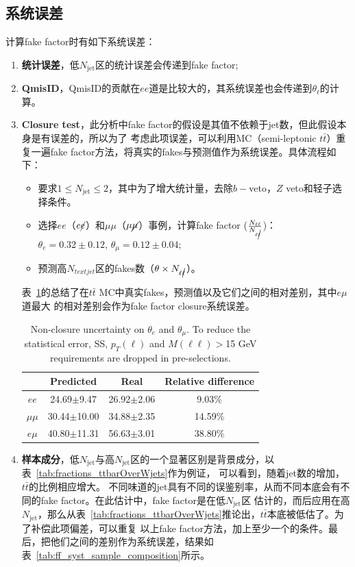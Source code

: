 \subsection{系统误差}
计算fake factor时有如下系统误差：
\begin{enumerate}
  \item \textbf{统计误差}，低$N_{\text{jet}}$区的统计误差会传递到fake factor;
  \item \textbf{QmisID}，QmisID的贡献在$ee$道是比较大的，其系统误差也会传递到$\theta_{\ell}$的计算。
  \item \textbf{Closure test}，此分析中fake factor的假设是其值不依赖于jet数，但此假设本身是有误差的，所以为了
考虑此项误差，可以利用MC（semi-leptonic $t\bar{t}$）重复一遍fake factor方法，将真实的fakes与预测值作为系统误差。具体流程如下：
  \begin{itemize}
   \item 要求$1\leq N_{\text{jet}}\leq2$，其中为了增大统计量，去除$b-$veto，$Z$ veto和轻子\pt 选择条件。
   \item 选择$ee$（$e\cancel{e}$）和$\mu\mu$（$\mu\cancel{\mu}$）事例，计算fake factor ($\frac{N_{\ell\ell}}{N_{\ell\cancel{\ell}}}$)：\\
   $\theta_{e}=0.32\pm0.12$, $\theta_{\mu}=0.12\pm0.04$;
   \item 预测高$N_{text{jet}}$区的fakes数（$\theta \times N_{\ell\cancel{\ell}}$）。
  \end{itemize}
表~\ref{tab:nonclosure_ttbar}的总结了在$t\bar{t}$ MC中真实fakes，预测值以及它们之间的相对差别，其中$e\mu$道最大
的相对差别会作为fake factor closure系统误差。
\begin{table}[h]
\centering
\begin{tabular}{c|ccc}
   &Predicted  &Real   &Relative difference  \\
\hline
$ee$   &24.69$\pm$9.47  &26.92$\pm$2.06 &9.03\% \\
$\mu\mu$ &30.44$\pm$10.00 &34.88$\pm$2.35 &14.59\% \\
$e\mu$   &40.80$\pm$11.31  &56.63$\pm$3.01  &38.80\% \\
\hline
\end{tabular}
\caption{Non-closure uncertainty on $\theta_{e}$ and $\theta_{\mu}$. To reduce the statistical error, SS, $p_T(\ell)$ and $M(\ell\ell)>$15 GeV requirements are dropped in pre-selections.}
\label{tab:nonclosure_ttbar}
\end{table}

  \item \textbf{样本成分}，低$N_{\text{jet}}$与高$N_{\text{jet}}$区的一个显著区别是背景成分，以表~\ref{tab:fractions_ttbarOverWjets}作为例证，
可以看到，随着jet数的增加，$t\bar{t}$的比例相应增大。
不同味道的jet具有不同的误鉴别率，从而不同本底会有不同的fake factor。在此估计中，fake factor是在低$N_{\text{jet}}$区
估计的，而后应用在高$N_{\text{jet}}$，那么从表~\ref{tab:fractions_ttbarOverWjets}推论出，$t\bar{t}$本底被低估了。为了补偿此项偏差，可以重复
以上fake factor方法，加上至少一个\bjet 的条件。最后，把他们之间的差别作为系统误差，结果如表~\ref{tab:ff_syst_sample_composition}所示。




\end{enumerate}
